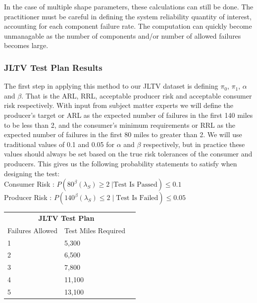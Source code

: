 \documentclass[12pt]{article}
\begin{document}
In the case of multiple shape parameters, these calculations can still be done.
The practitioner must be careful in defining the system reliability quantity of
interest, accounting for each component failure rate.  The computation can
quickly become  unmanagable as the number of components and/or number of allowed
failures becomes large.

\subsubsection{JLTV Test Plan Results}
The first step in applying this method to our JLTV dataset is defining $\pi_0$,
$\pi_1$, $\alpha$ and $\beta$.  That is the ARL, RRL, acceptable producer risk
and acceptable consumer risk respectively.  With input from subject matter
experts  we will define the producer's target or ARL as the expected number of
failures in the first 140 miles to be less  than 2, and the consumer's minimum
requirements or RRL as the expected number of failures in  the first 80 miles to
greater than 2.  We will use traditional values of 0.1 and 0.05 for $\alpha$ and
$\beta$ respectively, but in practice these values should always be set based on
the true risk tolerances of the consumer and producers.  This gives us the
following probability statements to satisfy when designing the test:
\\
Consumer Risk : $ P(80^\beta (\lambda_S) \geq 2 \; \vert \text{Test Is Passed}) \leq 0.1 $ \\
Producer Risk : $ P(140^\beta (\lambda_S) \leq 2 \; \vert \; \text{Test Is Failed}) \leq 0.05 $

\begin{tabular}{|l|l|r|}
\multicolumn{2}{c}{\textbf{JLTV Test Plan}} \\
\cline{1-2}
Failures Allowed    & Test Miles Required \\
\hline
1   & 5,300      \\
2   & 6,500      \\
3   & 7,800      \\
4   & 11,100     \\
5   & 13,100     \\
\hline
\end{tabular}
\end{document}
